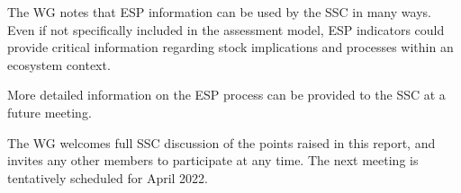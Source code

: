 \documentclass[
  10pt,
]{article}
\begin{document}
The WG notes that ESP information can be used by the SSC in many ways.
Even if not specifically included in the assessment model, ESP
indicators could provide critical information regarding stock
implications and processes within an ecosystem context.

More detailed information on the ESP process can be provided to the SSC
at a future meeting.

The WG welcomes full SSC discussion of the points raised in this report,
and invites any other members to participate at any time. The next
meeting is tentatively scheduled for April 2022.
\end{document}
